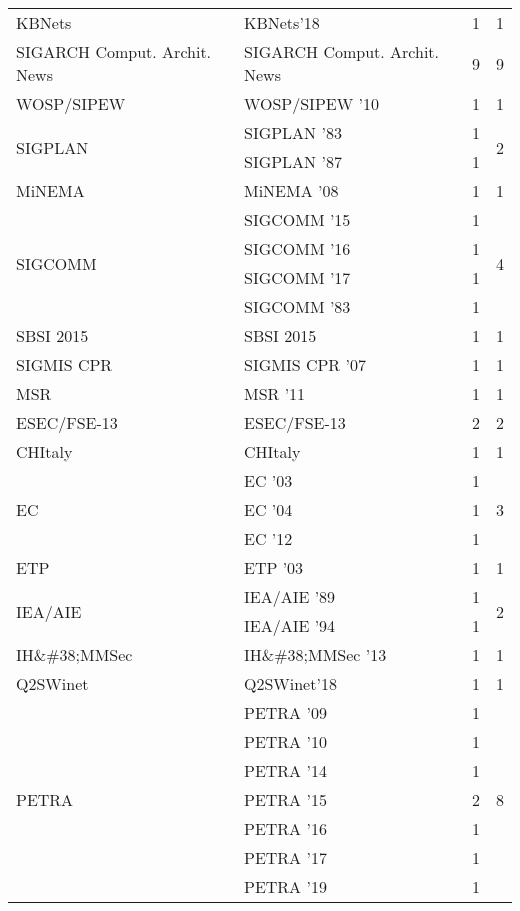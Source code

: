 \begin{table*}[t]
\begin{tabular}{llrr}
\multirow{1}{*}{KBNets} & KBNets'18 & 1 & \multirow{1}{*}{1}\\
\multirow{1}{*}{SIGARCH Comput. Archit. News} & SIGARCH Comput. Archit. News & 9 & \multirow{1}{*}{9}\\
\multirow{1}{*}{WOSP/SIPEW } & WOSP/SIPEW '10 & 1 & \multirow{1}{*}{1}\\
\multirow{2}{*}{SIGPLAN } & SIGPLAN '83 & 1 & \multirow{2}{*}{2}\\
& SIGPLAN '87 & 1 &\\
\multirow{1}{*}{MiNEMA } & MiNEMA '08 & 1 & \multirow{1}{*}{1}\\
\multirow{4}{*}{SIGCOMM } & SIGCOMM '15 & 1 & \multirow{4}{*}{4}\\
& SIGCOMM '16 & 1 &\\
& SIGCOMM '17 & 1 &\\
& SIGCOMM '83 & 1 &\\
\multirow{1}{*}{SBSI 2015} & SBSI 2015 & 1 & \multirow{1}{*}{1}\\
\multirow{1}{*}{SIGMIS CPR } & SIGMIS CPR '07 & 1 & \multirow{1}{*}{1}\\
\multirow{1}{*}{MSR } & MSR '11 & 1 & \multirow{1}{*}{1}\\
\multirow{1}{*}{ESEC/FSE-13} & ESEC/FSE-13 & 2 & \multirow{1}{*}{2}\\
\multirow{1}{*}{CHItaly} & CHItaly & 1 & \multirow{1}{*}{1}\\
\multirow{3}{*}{EC } & EC '03 & 1 & \multirow{3}{*}{3}\\
& EC '04 & 1 &\\
& EC '12 & 1 &\\
\multirow{1}{*}{ETP } & ETP '03 & 1 & \multirow{1}{*}{1}\\
\multirow{2}{*}{IEA/AIE } & IEA/AIE '89 & 1 & \multirow{2}{*}{2}\\
& IEA/AIE '94 & 1 &\\
\multirow{1}{*}{IH\&\#38;MMSec } & IH\&\#38;MMSec '13 & 1 & \multirow{1}{*}{1}\\
\multirow{1}{*}{Q2SWinet} & Q2SWinet'18 & 1 & \multirow{1}{*}{1}\\
\multirow{7}{*}{PETRA } & PETRA '09 & 1 & \multirow{7}{*}{8}\\
& PETRA '10 & 1 &\\
& PETRA '14 & 1 &\\
& PETRA '15 & 2 &\\
& PETRA '16 & 1 &\\
& PETRA '17 & 1 &\\
& PETRA '19 & 1 &\\

\end{tabular}
\end{table*}
